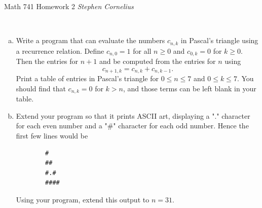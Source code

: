 \documentclass{article}
\begin{document}
\begin{center}
    Math 741
    \hfill Homework 2
    \hfill \textit{Stephen Cornelius}
\end{center}

\begin{problem} \\ 
\begin{enumerate}[a)]
    \item Write a program that can evaluate the numbers $c_{n,k}$ in Pascal's triangle using a recurrence relation.
Define $c_{n,0} = 1$ for all $n \geq 0$ and $c_{0,k}=0$ for $k \geq 0$. Then the entries for $n + 1$ and be computed from the entries for $n$ using 
\[
		c_{n+1,k} = c_{n,k} + c_{n,k-1}.
	\]
	Print a table of entries in Pascal's triangle for $0 \leq n \leq 7$ and $0 \leq k \leq 7$. You should find that $c_{n,k} = 0$ for $k > n$, and those terms can be left blank in your table.


	\item Extend your program so that it prints ASCII art, displaying a "." character for each even number and a "\#" character for each odd number. Hence the first few lines would be
	\begin{verbatim}
        #
        ##
        #.#
        ####
    \end{verbatim}
	Using your program, extend this output to $n = 31$.
\end{enumerate}
\end{problem}
\end{document}
